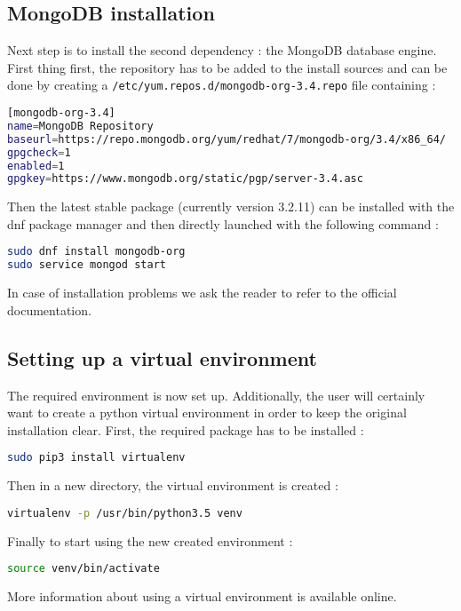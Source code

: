 \subsection{MongoDB installation}

Next step is to install the second dependency : the MongoDB database engine. First thing first, the repository has to be added to the install sources and can be done by creating a \texttt{/etc/yum.repos.d/mongodb-org-3.4.repo} file containing :
\smallskip
\begin{lstlisting}[language=bash]
[mongodb-org-3.4]
name=MongoDB Repository
baseurl=https://repo.mongodb.org/yum/redhat/7/mongodb-org/3.4/x86_64/
gpgcheck=1
enabled=1
gpgkey=https://www.mongodb.org/static/pgp/server-3.4.asc
\end{lstlisting}

Then the latest stable package (currently version 3.2.11) can be installed with the dnf package manager and then directly launched with the following command : 
\smallskip
\begin{lstlisting}[language=bash]
sudo dnf install mongodb-org
sudo service mongod start
\end{lstlisting}
In case of installation problems we ask the reader to refer to the official documentation.

\subsection{Setting up a virtual environment}

The required environment is now set up. Additionally, the user will certainly want to create a python virtual environment in order to keep the original installation clear. First, the required package has to be installed :
\smallskip
\begin{lstlisting}[language=bash]
sudo pip3 install virtualenv
\end{lstlisting}

Then in a new directory, the virtual environment is created :
\smallskip
\begin{lstlisting}[language=bash]
virtualenv -p /usr/bin/python3.5 venv
\end{lstlisting}

Finally to start using the new created environment :
\smallskip
\begin{lstlisting}[language=bash]
source venv/bin/activate
\end{lstlisting}

More information about using a virtual environment is available online. \citep{venv}

